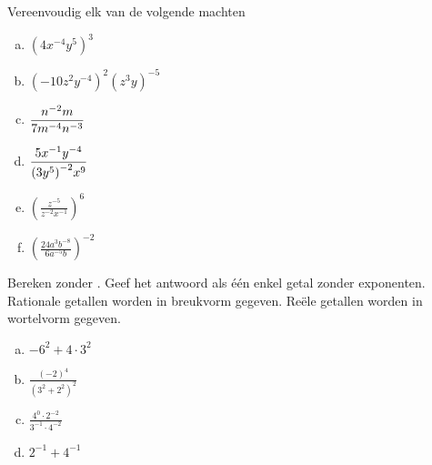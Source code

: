 \documentclass[12pt,twoside]{article}
\begin{document}
\begin{oefening}
  Vereenvoudig elk van de volgende machten
  \begin{multicols}{2}
    \begin{enumerate}[(a)]
      \itemsep1em
    \item $\displaystyle {\left( {4{x^{ - 4}}{y^5}} \right)^3}  $
    \item $\displaystyle {\left( { - 10{z^2}{y^{ - 4}}} \right)^2}{\left( {{z^3}y} \right)^{ - 5}}  $
    \item $\displaystyle \displaystyle \frac{{{n^{ - 2}}m}}{{7{m^{ - 4}}{n^{ - 3}}}}  $
    \item $\displaystyle \displaystyle \frac{{5{x^{ - 1}}{y^{ - 4}}}}{{{{\left( {3{y^5}} \right)}^{ - 2}}{x^9}}}  $
    \item $\displaystyle {\left( {\displaystyle \frac{{{z^{ - 5}}}}{{{z^{ - 2}}{x^{ - 1}}}}} \right)^6}  $
    \item $\displaystyle {\left( {\displaystyle \frac{{24{a^3}{b^{ - 8}}}}{{6{a^{ - 5}}b}}} \right)^{ - 2}}  $
    \end{enumerate}
  \end{multicols}
\end{oefening}

\begin{oefening}
  Bereken zonder . Geef het antwoord als één enkel getal zonder exponenten. Rationale getallen worden in breukvorm gegeven. Reële getallen worden in wortelvorm gegeven.
  \begin{multicols}{2}
    \begin{enumerate}[(a)]
      \itemsep1em
    \item $ - {6^2} + 4 \cdot {3^2} $
    \item $ \displaystyle \frac{{{{\left( { - 2} \right)}^4}}}{{{{\left( {{3^2} + {2^2}} \right)}^2}}} $
    \item $ \displaystyle \frac{{{4^0} \cdot {2^{ - 2}}}}{{{3^{ - 1}} \cdot {4^{ - 2}}}} $
    \item $ {2^{ - 1}} + {4^{ - 1}} $
    \end{enumerate}
  \end{multicols}
\end{oefening}
\end{document}
